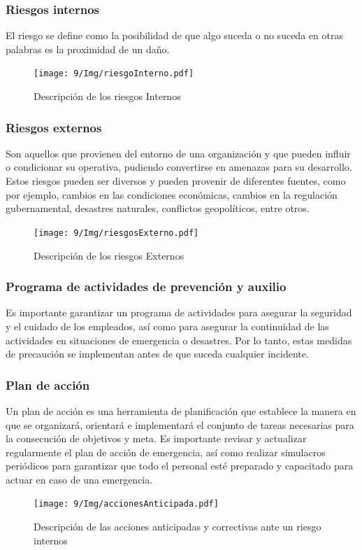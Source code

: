     \subsubsection{Riesgos internos}
    El riesgo se define como la posibilidad de que algo suceda o no suceda en otras palabras es la proximidad de un daño.\cite{H}
    \begin{figure}[H]
        \centering
        \texttt{[image: 9/Img/riesgoInterno.pdf]}
        \caption{Descripción de los riesgos Internos }
        \label{fig:bimanual}
    \end{figure}
    
    \subsubsection{Riesgos externos}
    Son  aquellos que provienen del entorno de una organización y que pueden influir o condicionar su operativa, pudiendo convertirse en amenazas para su desarrollo.\cite{H} 
    Estos riesgos pueden ser diversos y pueden provenir de diferentes fuentes, como por ejemplo, cambios en las condiciones económicas, cambios en la regulación gubernamental, desastres naturales, conflictos geopolíticos, entre otros.
    \begin{figure}[H]
        \centering
        \texttt{[image: 9/Img/riesgosExterno.pdf]}
        \caption{Descripción de los riesgos Externos }
        \label{fig:bimanual}
    \end{figure}
    \subsubsection{Programa de actividades de prevención y auxilio}
    Es importante garantizar un programa de actividades para asegurar la seguridad y el cuidado de los empleados, así como para asegurar la continuidad de las actividades en situaciones de emergencia o desastres. Por lo tanto, estas medidas de precaución se implementan antes de que suceda cualquier incidente.
    \subsubsection{Plan de acción}
    Un plan de acción es una herramienta de planificación que establece la manera en que se organizará, orientará e implementará el conjunto de tareas necesarias para la consecución de objetivos y meta.\cite{NR}
    Es importante revisar y actualizar regularmente el plan de acción de emergencia, así como realizar simulacros periódicos para garantizar que todo el personal esté preparado y capacitado para actuar en caso de una emergencia.
    \begin{figure}[H]
        \centering
        \texttt{[image: 9/Img/accionesAnticipada.pdf]}
        \caption{Descripción de las acciones anticipadas y correctivas ante un riesgo internos}
        \label{fig:mapa-itq}
    \end{figure}
    
